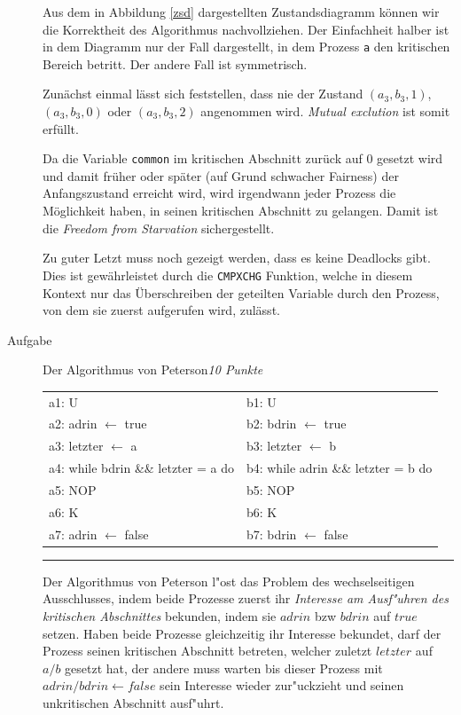 \documentclass[a4paper,twoside,12pt,fleqn]{article}
\newcounter{AUFGNR}
\newcommand{\AUFGABE}[2]{\vspace{0.3cm}\item[Aufgabe~\arabic{AUFGNR}]\stepcounter{AUFGNR} #1\hfill\emph{#2}}
\begin{document}
\begin{description}
Aus dem in Abbildung \ref{zsd} dargestellten Zustandsdiagramm können wir die Korrektheit des Algorithmus nachvollziehen. Der Einfachheit halber ist in dem Diagramm nur der Fall dargestellt, in dem Prozess \texttt{a} den kritischen Bereich betritt. Der andere Fall ist symmetrisch.

Zunächst einmal lässt sich feststellen, dass nie der Zustand $(a_3, b_3, 1)$, $(a_3, b_3, 0)$ oder $(a_3, b_3, 2)$ angenommen wird. \textit{Mutual exclution} ist somit erfüllt.

Da die Variable \texttt{common} im kritischen Abschnitt zurück auf $0$ gesetzt wird und damit früher oder später (auf Grund schwacher Fairness) der Anfangszustand erreicht wird, wird irgendwann jeder Prozess die Möglichkeit haben, in seinen kritischen Abschnitt zu gelangen. Damit ist die \textit{Freedom from Starvation} sichergestellt.

Zu guter Letzt muss noch gezeigt werden, dass es keine Deadlocks gibt. Dies ist gewährleistet durch die \texttt{CMPXCHG} Funktion, welche in diesem Kontext nur das Überschreiben der geteilten Variable durch den Prozess, von dem sie zuerst aufgerufen wird, zulässt.


\AUFGABE{Der Algorithmus von Peterson}{10 Punkte}
	\begin{tabular}{l|l}
		a1: U & b1: U\\
		a2: adrin $\leftarrow$ true & b2: bdrin $\leftarrow$ true\\
		a3: letzter $\leftarrow$ a & b3: letzter $\leftarrow$ b\\
		a4: while bdrin \&\& letzter = a do &
			b4: while adrin \&\& letzter = b do\\
		a5: \quad NOP & b5: \quad NOP\\
		a6: K & b6: K\\
		a7: adrin $\leftarrow$ false & b7: bdrin $\leftarrow$ false
	\end{tabular}
	\hrule

	Der Algorithmus von Peterson l"ost das Problem des wechselseitigen
	Ausschlusses, indem beide Prozesse zuerst ihr \emph{Interesse am Ausf"uhren
	des kritischen Abschnittes} bekunden, indem sie $adrin$ bzw $bdrin$ auf
	$true$ setzen. Haben beide Prozesse gleichzeitig ihr Interesse bekundet,
	darf der Prozess seinen kritischen Abschnitt betreten, welcher zuletzt
	$letzter$ auf $a/b$ gesetzt hat, der andere muss warten bis dieser Prozess
	mit $adrin/bdrin \leftarrow false$ sein Interesse wieder zur"uckzieht und
	seinen unkritischen Abschnitt ausf"uhrt.


\end{description}
\end{document}
